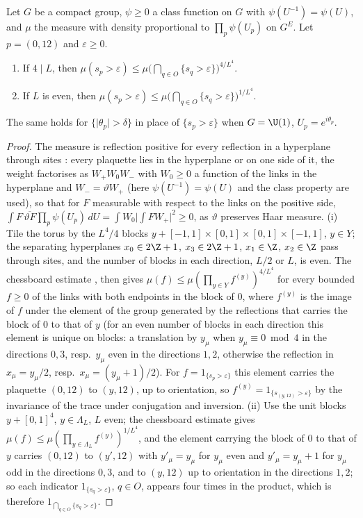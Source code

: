 \begin{lemma}\label{rDtwo:chess}
Let $G$ be a compact group, $\psi\ge0$ a class function on $G$ with
$\psi(U^{-1})=\psi(U)$, and $\mu$ the measure with density proportional to
$\prod_p\psi(U_p)$ on $G^E$. Let $p=(0,12)$ and $\varepsilon\ge0$.
\begin{enumerate}[label=\textup{(\roman*)},leftmargin=*]
\item If $4\mid L$, then $\mu(s_p>\varepsilon)\le\mu\bigl(\bigcap_{q\in O}
\{s_q>\varepsilon\}\bigr)^{4/L^4}$.
\item If $L$ is even, then $\mu(s_p>\varepsilon)\le\mu\bigl(\bigcap_{q\in O}
\{s_q>\varepsilon\}\bigr)^{1/L^4}$.
\end{enumerate}
The same holds for $\{\lvert\theta_p\rvert>\delta\}$ in place of $\{s_p>
\varepsilon\}$ when $G=\U(1)$, $U_p=e^{i\theta_p}$.
\end{lemma}

\begin{proof}
The measure is reflection positive for every reflection in a hyperplane
through sites \cite{OSei78,Sei82}: every plaquette lies in the hyperplane
or on one side of it, the weight factorises as $W_+W_0W_-$ with $W_0\ge0$
a function of the links in the hyperplane and $W_-=\vartheta W_+$ (here
$\psi(U^{-1})=\psi(U)$ and the class property are used), so that for $F$
measurable with respect to the links on the positive side, $\int F\,
\overline{\vartheta F}\prod_p\psi(U_p)\,dU=\int W_0\bigl\lvert\int FW_+\bigr
\rvert^2\ge0$, as $\vartheta$ preserves Haar measure. (i) Tile the torus by
the $L^4/4$ blocks $y+[-1,1]\times[0,1]\times[0,1]\times[-1,1]$, $y\in Y$;
the separating hyperplanes $x_0\in2\Z+1$, $x_3\in2\Z+1$, $x_1\in\Z$, $x_2\in
\Z$ pass through sites, and the number of blocks in each direction, $L/2$
or $L$, is even. The chessboard estimate \cite[Sect.~2]{FILS78},
\cite[Sect.~5.3]{Bis09} then gives $\mu(f)\le\mu(\prod_{y\in Y}f^{(y)})^{4/
L^4}$ for every bounded $f\ge0$ of the links with both endpoints in the
block of $0$, where $f^{(y)}$ is the image of $f$ under the element of the
group generated by the reflections that carries the block of $0$ to that
of $y$ (for an even number of blocks in each direction this element is
unique on blocks: a translation by $y_\mu$ when $y_\mu\equiv0\bmod4$ in the
directions $0,3$, resp.\ $y_\mu$ even in the directions $1,2$, otherwise the
reflection in $x_\mu=y_\mu/2$, resp.\ $x_\mu=(y_\mu+1)/2$). For $f=1_{\{s_p>
\varepsilon\}}$ this element carries the plaquette $(0,12)$ to $(y,12)$, up
to orientation, so $f^{(y)}=1_{\{s_{(y,12)}>\varepsilon\}}$ by the invariance
of the trace under conjugation and inversion. (ii) Use the unit blocks $y+
[0,1]^4$, $y\in\Lambda_L$, $L$ even; the chessboard estimate gives $\mu(f)
\le\mu(\prod_{y\in\Lambda_L}f^{(y)})^{1/L^4}$, and the element carrying the
block of $0$ to that of $y$ carries $(0,12)$ to $(y',12)$ with $y'_\mu=y_\mu$
for $y_\mu$ even and $y'_\mu=y_\mu+1$ for $y_\mu$ odd in the directions
$0,3$, and to $(y,12)$ up to orientation in the directions $1,2$; so each
indicator $1_{\{s_q>\varepsilon\}}$, $q\in O$, appears four times in the
product, which is therefore $1_{\bigcap_{q\in O}\{s_q>\varepsilon\}}$.
\end{proof}

